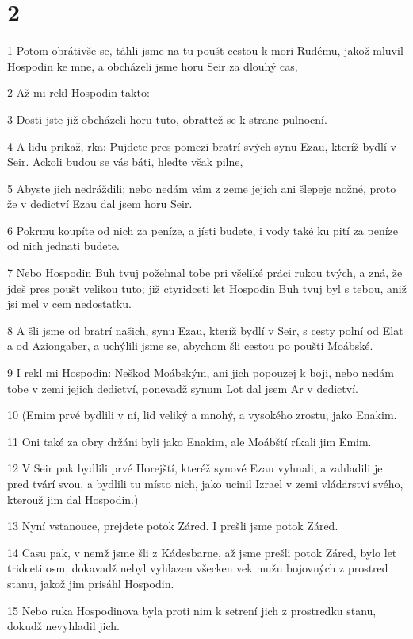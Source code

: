\chapter{2}

\par 1 Potom obrátivše se, táhli jsme na tu poušt cestou k mori Rudému, jakož mluvil Hospodin ke mne, a obcházeli jsme horu Seir za dlouhý cas,
\par 2 Až mi rekl Hospodin takto:
\par 3 Dosti jste již obcházeli horu tuto, obrattež se k strane pulnocní.
\par 4 A lidu prikaž, rka: Pujdete pres pomezí bratrí svých synu Ezau, kteríž bydlí v Seir. Ackoli budou se vás báti, hledte však pilne,
\par 5 Abyste jich nedráždili; nebo nedám vám z zeme jejich ani šlepeje nožné, proto že v dedictví Ezau dal jsem horu Seir.
\par 6 Pokrmu koupíte od nich za peníze, a jísti budete, i vody také ku pití za peníze od nich jednati budete.
\par 7 Nebo Hospodin Buh tvuj požehnal tobe pri všeliké práci rukou tvých, a zná, že jdeš pres poušt velikou tuto; již ctyridceti let Hospodin Buh tvuj byl s tebou, aniž jsi mel v cem nedostatku.
\par 8 A šli jsme od bratrí našich, synu Ezau, kteríž bydlí v Seir, s cesty polní od Elat a od Aziongaber, a uchýlili jsme se, abychom šli cestou po poušti Moábské.
\par 9 I rekl mi Hospodin: Neškod Moábským, ani jich popouzej k boji, nebo nedám tobe v zemi jejich dedictví, ponevadž synum Lot dal jsem Ar v dedictví.
\par 10 (Emim prvé bydlili v ní, lid veliký a mnohý, a vysokého zrostu, jako Enakim.
\par 11 Oni také za obry držáni byli jako Enakim, ale Moábští ríkali jim Emim.
\par 12 V Seir pak bydlili prvé Horejští, kteréž synové Ezau vyhnali, a zahladili je pred tvárí svou, a bydlili tu místo nich, jako ucinil Izrael v zemi vládarství svého, kterouž jim dal Hospodin.)
\par 13 Nyní vstanouce, prejdete potok Záred. I prešli jsme potok Záred.
\par 14 Casu pak, v nemž jsme šli z Kádesbarne, až jsme prešli potok Záred, bylo let tridceti osm, dokavadž nebyl vyhlazen všecken vek mužu bojovných z prostred stanu, jakož jim prisáhl Hospodin.
\par 15 Nebo ruka Hospodinova byla proti nim k setrení jich z prostredku stanu, dokudž nevyhladil jich.
